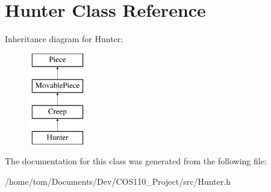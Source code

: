 \hypertarget{classHunter}{\section{Hunter Class Reference}
\label{classHunter}
}
Inheritance diagram for Hunter\-:\begin{figure}[H]
\begin{center}
\leavevmode
\includegraphics[height=4.000000cm]{classHunter}
\end{center}
\end{figure}


The documentation for this class was generated from the following file\-:\begin{DoxyCompactItemize}
\item 
/home/tom/\-Documents/\-Dev/\-C\-O\-S110\-\_\-\-Project/src/Hunter.\-h\end{DoxyCompactItemize}
